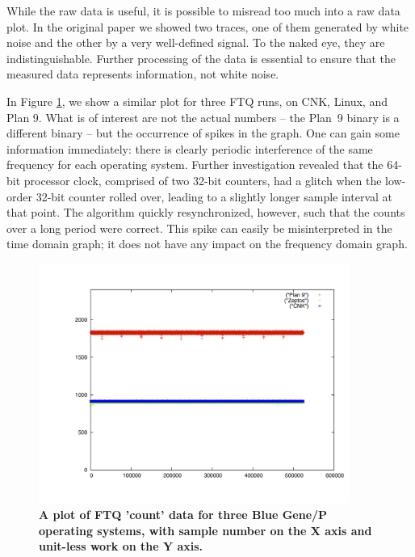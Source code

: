 While the raw data is useful, it is possible to misread too much into a raw data plot. In the original paper we showed two traces, one of them generated by white noise and the other by a very well-defined signal. To the naked eye, they are indistinguishable. Further processing of the data is essential to ensure that the measured data represents information, not white noise. 

In Figure \ref{rawdata}, we show a similar plot for three FTQ runs, on CNK, Linux, and Plan 9. What is of interest are not the actual numbers -- the Plan~9 binary 
is a different binary -- but the occurrence of spikes in the graph. One can gain some information immediately: there is clearly periodic interference of the same 
frequency for each operating system. Further investigation revealed that the 64-bit processor clock, comprised of two 32-bit counters, had a glitch when the
low-order 32-bit counter rolled over, leading to a slightly longer sample interval at that point. The algorithm quickly resynchronized, however, such that the 
counts over a long period were correct. This spike can easily be misinterpreted in the time domain graph; it does not have any impact on the frequency domain graph. 
\begin{figure}[h]
\begin{center}
 \includegraphics[width=4in]{raw.jpg}
 \caption{{\bf A plot of FTQ 'count' data for three Blue Gene/P operating systems, with sample
 number on the X axis and unit-less work on the Y axis.}}
\label{rawdata}
\end{center}
\end{figure}

